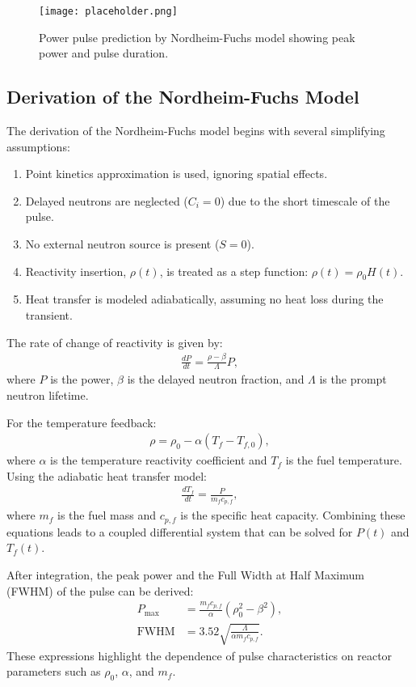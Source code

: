 \begin{figure}[H]
    \centering
    \texttt{[image: placeholder.png]}
    \caption{Power pulse prediction by Nordheim-Fuchs model showing peak power and pulse duration.}
    \label{fig:nordheim_fuchs}
\end{figure}

\subsection{Derivation of the Nordheim-Fuchs Model}
The derivation of the Nordheim-Fuchs model begins with several simplifying assumptions:
\begin{enumerate}
    \item Point kinetics approximation is used, ignoring spatial effects.
    \item Delayed neutrons are neglected ($C_i = 0$) due to the short timescale of the pulse.
    \item No external neutron source is present ($S = 0$).
    \item Reactivity insertion, $\rho(t)$, is treated as a step function: $\rho(t) = \rho_0 H(t)$.
    \item Heat transfer is modeled adiabatically, assuming no heat loss during the transient.
\end{enumerate}
The rate of change of reactivity is given by:
\begin{align*}
    \frac{dP}{dt} = \frac{\rho - \beta}{\Lambda}P,
\end{align*}
where $P$ is the power, $\beta$ is the delayed neutron fraction, and $\Lambda$ is the prompt neutron lifetime. 

For the temperature feedback:
\begin{align*}
    \rho = \rho_0 - \alpha(T_f - T_{f,0}),
\end{align*}
where $\alpha$ is the temperature reactivity coefficient and $T_f$ is the fuel temperature. Using the adiabatic heat transfer model:
\begin{align*}
    \frac{dT_f}{dt} = \frac{P}{m_f c_{p,f}},
\end{align*}
where $m_f$ is the fuel mass and $c_{p,f}$ is the specific heat capacity. Combining these equations leads to a coupled differential system that can be solved for $P(t)$ and $T_f(t)$.

After integration, the peak power and the Full Width at Half Maximum (FWHM) of the pulse can be derived:
\begin{align*}
    P_{\text{max}} &= \frac{m_f c_{p,f}}{\alpha}\left(\rho_0^2 - \beta^2\right), \\
    \text{FWHM} &= 3.52\sqrt{\frac{\Lambda}{\alpha m_f c_{p,f}}}.
\end{align*}
These expressions highlight the dependence of pulse characteristics on reactor parameters such as $\rho_0$, $\alpha$, and $m_f$.


